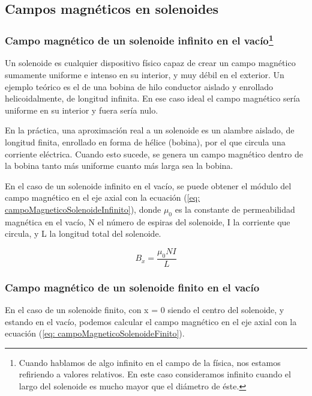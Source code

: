 \documentclass[a4paper,12pt]{article}
\begin{document}
    \subsection*{Campos magnéticos en solenoides}

    \subsubsection*{Campo magnético de un solenoide infinito en el vacío\footnote{Cuando hablamos de algo infinito en el campo de la física, nos estamos refiriendo a valores relativos. En este caso consideramos infinito cuando el largo del solenoide es mucho mayor que el diámetro de éste.}}

        Un solenoide es cualquier dispositivo físico capaz de crear un campo magnético sumamente uniforme e intenso en su interior, y muy débil en el exterior. Un ejemplo teórico es el de una bobina de hilo conductor aislado y enrollado helicoidalmente, de longitud infinita. En ese caso ideal el campo magnético sería uniforme en su interior y fuera sería nulo.

        En la práctica, una aproximación real a un solenoide es un alambre aislado, de longitud finita, enrollado en forma de hélice (bobina), por el que circula una corriente eléctrica. Cuando esto sucede, se genera un campo magnético dentro de la bobina tanto más uniforme cuanto más larga sea la bobina.

        En el caso de un solenoide infinito en el vacío, se puede obtener el módulo del campo magnético en el eje axial con la ecuación (\ref{eq: campoMagneticoSolenoideInfinito}), donde $\mu_0$ es la constante de permeabilidad magnética en el vacío, N el número de espiras del solenoide, I la corriente que circula, y L la longitud total del solenoide.

        \begin{equation}
            \label{eq: campoMagneticoSolenoideInfinito}
            B_x = \frac{\mu_0 N I}{L}
        \end{equation}

    \subsubsection*{Campo magnético de un solenoide finito en el vacío}
    
        En el caso de un solenoide finito, con x = 0 siendo el centro del solenoide, y estando en el vacío, podemos calcular el campo magnético en el eje axial con la ecuación (\ref{eq: campoMagneticoSolenoideFinito}).
\end{document}
